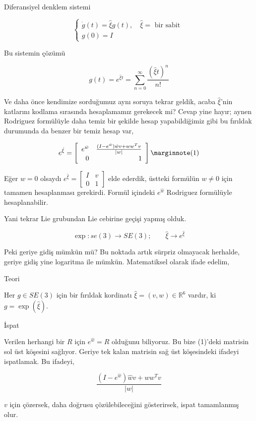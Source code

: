 \documentclass[12pt,fleqn]{article}\usepackage{../../common}
\begin{document}
Diferansiyel denklem sistemi

$$ \left\{ \begin{array}{ll}
\dot{g}(t) = \hat{\xi}g(t), \quad \hat{\xi} = \textrm{ bir sabit } \\
g(0) = I
\end{array} \right. $$

Bu sistemin çözümü

$$ 
g(t) = e^{\hat{\xi} t} = \sum_{n=0}^{\infty} \frac{(\hat{\xi} t)^n}{n!}
 $$

Ve daha önce kendimize sorduğumuz aynı soruya tekrar geldik, acaba
$\hat{\xi}$'nin katlarını kodlama sırasında hesaplamamız gerekecek mi?
Cevap yine hayır; aynen Rodriguez formülüyle daha temiz bir şekilde hesap
yapabildiğimiz gibi bu fırıldak durumunda da benzer bir temiz hesap var,

$$ e^{\hat{\xi}} = 
\left[\begin{array}{rrr}
e^{\hat{w}} & \frac{(I-e^{\hat{w}}) \hat{w}v + ww^Tv}{|w|} \\
0 & 1
\end{array}\right]
\mlabel{1}
$$

Eğer $w = 0$ olsaydı $e^{\hat{\xi}}=\left[\begin{array}{rrr} I & v\\0 & 1\end{array}\right]$ 
elde ederdik, üstteki formülün $w \ne 0$ için tamamen hesaplanması
gerekirdi.  Formül içindeki $e^{\hat{w}}$ Rodriguez formülüyle hesaplanabilir.

Yani tekrar Lie grubundan Lie cebirine geçişi yapmış olduk. 

$$ \exp: se(3) \to SE(3); \qquad \hat{\xi} \to e^{\hat{\xi}} $$

Peki geriye gidiş mümkün mü? Bu noktada artık sürpriz olmayacak herhalde,
geriye gidiş yine logaritma ile mümkün. Matematiksel olarak ifade edelim, 

Teori 

Her $g \in SE(3)$ için bir fırıldak kordinatı $\hat{\xi}=(v,w) \in
\mathbb{R}^6$ vardır, ki $g = \exp(\hat{\xi})$. 

İspat

Verilen herhangi bir $R$ için $e^{\hat{w}} = R$ olduğunu biliyoruz. Bu bize
(1)'deki matrisin sol üst köşesini sağlıyor. Geriye tek kalan matrisin sağ
üst köşesindeki ifadeyi ispatlamak. Bu ifadeyi, 

$$ \frac{(I-e^{\hat{w}}) \hat{w}v + ww^Tv}{|w|} $$

$v$ için çözersek, daha doğrusu çözülebileceğini gösterirsek, ispat
tamamlanmış olur. 
\end{document}
